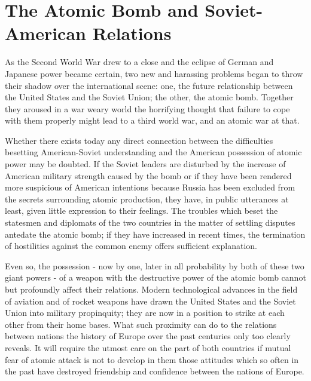 
\chapter[The Atomic Bomb and Soviet-American Relations]{The Atomic Bomb and Soviet-American Relations}

\vspace{-2pt}


\vspace{39pt}

As the Second World War drew to a close and the eclipse of German and Japanese power became certain, two new and harassing problems began to throw their shadow over the international scene: one, the future relationship between the United States and the Soviet Union; the other, the atomic bomb. Together they aroused in a war weary world the horrifying thought that failure to cope with them properly might lead to a third world war, and an atomic war at that.

Whether there exists today any direct connection between the difficulties besetting American-Soviet understanding and the American possession of atomic power may be doubted. If the Soviet leaders are disturbed by the increase of American military strength caused by the bomb or if they have been rendered more suspicious of American intentions because Russia has been excluded from the secrets surrounding atomic production, they have, in public utterances at least, given little expression to their feelings. The troubles which beset the statesmen and diplomats of the two countries in the matter of settling disputes antedate the atomic bomb; if they have increased in recent times, the termination of hostilities against the common enemy offers sufficient explanation.

Even so, the possession - now by one, later in all probability by both of these two giant powers - of a weapon with the destructive power of the atomic bomb cannot but profoundly affect their relations. Modern technological advances in the field of aviation and of rocket weapons have drawn the United States and the Soviet Union into military propinquity; they are now in a position to strike at each other from their home bases. What such proximity can do to the relations between nations the history of Europe over the past centuries only too clearly reveals. It will require the utmost care on the part of both countries if mutual fear of atomic attack is not to develop in them those attitudes which so often in the past have destroyed friendship and confidence between the nations of Europe.

